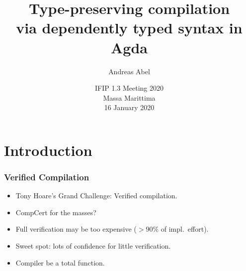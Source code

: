 \documentclass[t,fleqn,usenames,dvipsnames]{beamer}
\title[Dependently-Typed Compilation]{%
Type-preserving compilation \\ via dependently typed syntax in Agda}
\author[Abel]{
  Andreas Abel\inst{1}
}
\institute[] %
{
  \inst{1}
  Department of Computer Science and Engineering\\
  Chalmers and Gothenburg University, Sweden \\[1ex]
}
\date[IFIP 1.3 2020] %
{ IFIP 1.3 Meeting 2020\\
  Massa Marittima \\
  16 January 2020
}
\begin{document}
\maketitle






\section{Introduction}


\begin{frame}%
  \frametitle{Verified Compilation}
  \vspace{-3ex}
  \begin{itemize}
  \item Tony Hoare's Grand Challenge: Verified compilation.
  \item CompCert for the masses?
  \item Full verification may be too expensive ($> 90\%$ of impl.\ effort).
  \item Sweet spot: lots of confidence for little verification.
  \item Compiler be a \alert{total} function.
  \end{itemize}
\end{frame}

\end{document}
